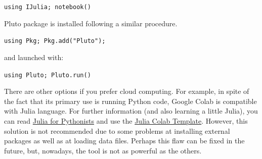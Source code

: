 \vspace{1mm}
	\begin{center}
		\texttt{using IJulia; notebook()} 
	\end{center}
\vspace{1mm}

Pluto package is installed following a similar procedure. 

\vspace{1mm}
\begin{center}
	\texttt{using Pkg; Pkg.add("Pluto");}
\end{center}
\vspace{1mm}

and launched with:

\vspace{1mm}
\begin{center}
	\texttt{using Pluto; Pluto.run()}
\end{center}
\vspace{1mm}

There are other options if you prefer cloud computing. For  example, in spite of the fact that its primary use is running Python code, Google Colab is compatible with Julia language. For further information (and also learning a little Julia), you can read \href{https://colab.research.google.com/github/ageron/julia_notebooks/blob/master/Julia_for_Pythonistas.ipynb#scrollTo=GIeFXS0F0zww}{Julia for Pythonists} and use the \href{https://colab.research.google.com/github/ageron/julia_notebooks/blob/master/Julia_Colab_Notebook_Template.ipynb}{Julia Colab Template}. However, this solution is not recommended due to some problems at installing external packages as well as at loading data files. Perhaps this flaw can be fixed in the future, but, nowadays, the tool is not as powerful as the others.

